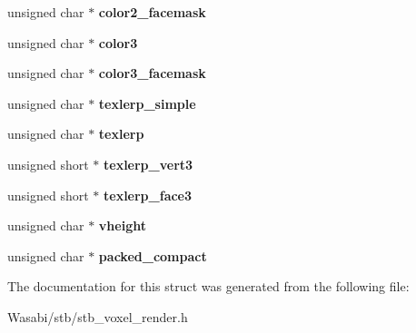 \begin{DoxyCompactItemize}
\item 
unsigned char $\ast$ {\bfseries color2\+\_\+facemask}\hypertarget{structstbvox__input__description_a818b7f942646bebbf0f82fcaefd789c1}{}\label{structstbvox__input__description_a818b7f942646bebbf0f82fcaefd789c1}

\item 
unsigned char $\ast$ {\bfseries color3}\hypertarget{structstbvox__input__description_ace0d11f8bee2d0c06f8667f2deb8aa5d}{}\label{structstbvox__input__description_ace0d11f8bee2d0c06f8667f2deb8aa5d}

\item 
unsigned char $\ast$ {\bfseries color3\+\_\+facemask}\hypertarget{structstbvox__input__description_ae31b9c1b9cab3f65ebe4d4a3e6666ae8}{}\label{structstbvox__input__description_ae31b9c1b9cab3f65ebe4d4a3e6666ae8}

\item 
unsigned char $\ast$ {\bfseries texlerp\+\_\+simple}\hypertarget{structstbvox__input__description_ab1cf7cf28a790314823e9352fbf75af4}{}\label{structstbvox__input__description_ab1cf7cf28a790314823e9352fbf75af4}

\item 
unsigned char $\ast$ {\bfseries texlerp}\hypertarget{structstbvox__input__description_ac45229a87f7af573a3faebd8a86100ee}{}\label{structstbvox__input__description_ac45229a87f7af573a3faebd8a86100ee}

\item 
unsigned short $\ast$ {\bfseries texlerp\+\_\+vert3}\hypertarget{structstbvox__input__description_a1a903709051623057c10457bcad9cac6}{}\label{structstbvox__input__description_a1a903709051623057c10457bcad9cac6}

\item 
unsigned short $\ast$ {\bfseries texlerp\+\_\+face3}\hypertarget{structstbvox__input__description_a5e1ea7c30d1f8561a21c7c261b6ed0e0}{}\label{structstbvox__input__description_a5e1ea7c30d1f8561a21c7c261b6ed0e0}

\item 
unsigned char $\ast$ {\bfseries vheight}\hypertarget{structstbvox__input__description_a02de8f98d512dc9cef6094ad7571be05}{}\label{structstbvox__input__description_a02de8f98d512dc9cef6094ad7571be05}

\item 
unsigned char $\ast$ {\bfseries packed\+\_\+compact}\hypertarget{structstbvox__input__description_a1882620a92c49f8924089e33152acc36}{}\label{structstbvox__input__description_a1882620a92c49f8924089e33152acc36}

\end{DoxyCompactItemize}


The documentation for this struct was generated from the following file\+:\begin{DoxyCompactItemize}
\item 
Wasabi/stb/stb\+\_\+voxel\+\_\+render.\+h\end{DoxyCompactItemize}
